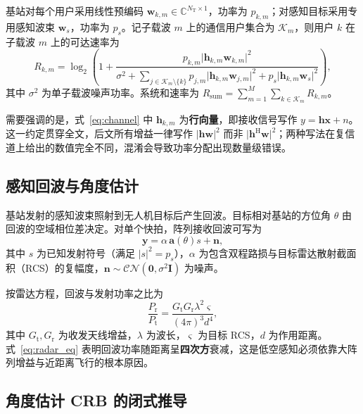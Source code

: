 基站对每个用户采用线性预编码 $\mathbf{w}_{k,m}\in\mathbb{C}^{N_{\mathrm{T}}\times 1}$，功率为 $p_{k,m}$；对感知目标采用专用感知波束 $\mathbf{w}_{s}$，功率为 $p_{s}$。记子载波 $m$ 上的通信用户集合为 $\mathcal{K}_m$，则用户 $k$ 在子载波 $m$ 上的可达速率为
\begin{equation}
  R_{k,m}=\log_2\!\left(1+\frac{p_{k,m}\lvert\mathbf{h}_{k,m}\mathbf{w}_{k,m}\rvert^{2}}
  {\sigma^{2}+\sum_{j\in\mathcal{K}_m\setminus\{k\}}p_{j,m}\lvert\mathbf{h}_{k,m}\mathbf{w}_{j,m}\rvert^{2}
  +p_{s}\lvert\mathbf{h}_{k,m}\mathbf{w}_{s}\rvert^{2}}\right),
  \label{eq:rate}
\end{equation}
其中 $\sigma^{2}$ 为单子载波噪声功率。系统和速率为 $R_{\mathrm{sum}}=\sum_{m=1}^{M}\sum_{k\in\mathcal{K}_m}R_{k,m}$。

需要强调的是，式~\eqref{eq:channel} 中 $\mathbf{h}_{k,m}$ 为\textbf{行向量}，即接收信号写作 $y=\mathbf{h}\mathbf{x}+n$。这一约定贯穿全文，后文所有增益一律写作 $\lvert\mathbf{h}\mathbf{w}\rvert^{2}$ 而非 $\lvert\mathbf{h}^{\mathrm{H}}\mathbf{w}\rvert^{2}$；两种写法在复信道上给出的数值完全不同，混淆会导致功率分配出现数量级错误。

\subsection{感知回波与角度估计}
\label{sec:sensing}

基站发射的感知波束照射到无人机目标后产生回波。目标相对基站的方位角 $\theta$ 由回波的空域相位差决定。对单个快拍，阵列接收回波可写为
\begin{equation}
  \mathbf{y}=\alpha\,\mathbf{a}(\theta)s+\mathbf{n},
  \label{eq:echo}
\end{equation}
其中 $s$ 为已知发射符号（满足 $\lvert s\rvert^{2}=p_{s}$），$\alpha$ 为包含双程路损与目标雷达散射截面积（RCS）的复幅度，$\mathbf{n}\sim\mathcal{CN}(\mathbf{0},\sigma^{2}\mathbf{I})$ 为噪声。

按雷达方程，回波与发射功率之比为
\begin{equation}
  \frac{P_{\mathrm{r}}}{P_{\mathrm{t}}}=\frac{G_{\mathrm{t}}G_{\mathrm{r}}\lambda^{2}\varsigma}{(4\pi)^{3}d^{4}},
  \label{eq:radar_eq}
\end{equation}
其中 $G_{\mathrm{t}},G_{\mathrm{r}}$ 为收发天线增益，$\lambda$ 为波长，$\varsigma$ 为目标 RCS，$d$ 为作用距离。式~\eqref{eq:radar_eq} 表明回波功率随距离呈\textbf{四次方}衰减，这是低空感知必须依靠大阵列增益与近距离飞行的根本原因。

\subsection{角度估计 CRB 的闭式推导}
\label{sec:crb}

